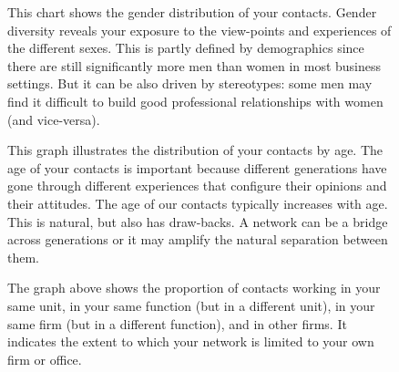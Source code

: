 \documentclass[a4paper,12pt]{article}
\begin{document}
\begin{figure}[H]
\centering
{}
\hspace{.01in}
\caption{This chart shows the gender distribution of your contacts. Gender diversity reveals your exposure to the view-points and experiences of the different sexes. This is partly defined by demographics since there are still significantly more men than women in most business settings. But it can be also driven by stereotypes: some men may find it difficult to build good professional relationships with women (and vice-versa).}
\end{figure}


\begin{figure}[H]
\centering
{}
\hspace{.01in}
\caption{This graph illustrates the distribution of your contacts by age. The age of your contacts is important because different generations have gone through different experiences that configure their opinions and their attitudes. The age of our contacts typically increases with age. This is natural, but also has draw-backs. A network can be a bridge across generations or it may amplify the natural separation between them.}
\end{figure}


\begin{figure}[H]
\centering
{}
\hspace{.01in}
\caption{The graph above shows the proportion of contacts working in your same unit, in your same function (but in a different unit), in your same firm (but in a different function), and in other firms. It indicates the extent to which your network is limited to your own firm or office.}
\end{figure}
\end{document}
